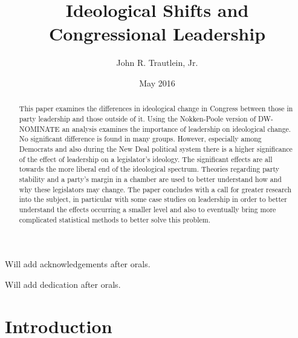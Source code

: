 \documentclass[12pt,twoside]{reedthesis}
\title{Ideological Shifts and Congressional Leadership}
\author{John R. Trautlein, Jr.}
\date{May 2016}
\begin{document}
      \maketitle
  
  \frontmatter %
  \pagestyle{empty} %

      \begin{acknowledgements}
      Will add acknowledgements after orals.
    \end{acknowledgements}
  
  

      \hypersetup{linkcolor=black}
    \setcounter{tocdepth}{2}
    \tableofcontents
  
      \listoftables
  
      \listoffigures
  
      \begin{abstract}
      This paper examines the differences in ideological change in Congress
      between those in party leadership and those outside of it. Using the
      Nokken-Poole version of DW-NOMINATE an analysis examines the importance
      of leadership on ideological change. No significant difference is found
      in many groups. However, especially among Democrats and also during the
      New Deal political system there is a higher significance of the effect
      of leadership on a legislator's ideology. The significant effects are
      all towards the more liberal end of the ideological spectrum. Theories
      regarding party stability and a party's margin in a chamber are used to
      better understand how and why these legislators may change. The paper
      concludes with a call for greater research into the subject, in
      particular with some case studies on leadership in order to better
      understand the effects occurring a smaller level and also to eventually
      bring more complicated statistical methods to better solve this problem.
    \end{abstract}
  
      \begin{dedication}
      Will add dedication after orals.
    \end{dedication}
  
  \mainmatter %
  \pagestyle{fancyplain} %

  \doublespacing
  
  \chapter*{Introduction}\label{introduction}
  
\end{document}
